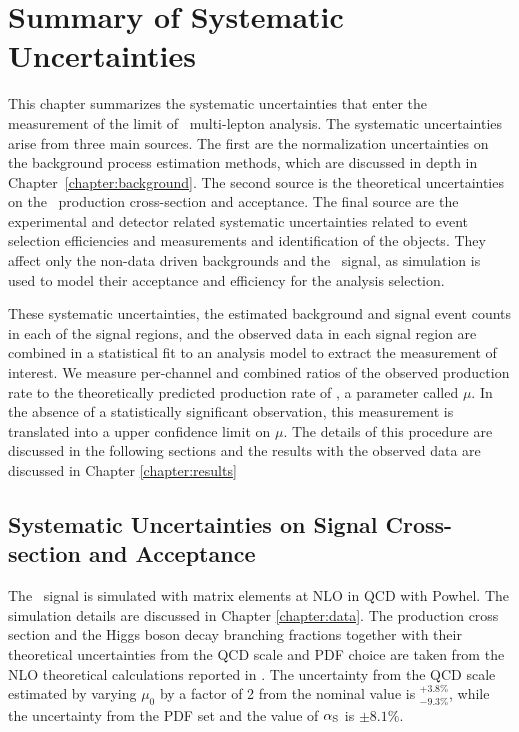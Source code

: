 \chapter[Summary of Systematic Uncertainties][Summary of Systematic Uncertainties]{Summary of Systematic Uncertainties}
\label{chapter:systematics} 

This chapter summarizes the systematic uncertainties that enter the measurement of the limit of \tth\ multi-lepton analysis. The systematic uncertainties arise from three main sources. The first are the normalization uncertainties on the background process estimation methods, which are discussed in depth in Chapter~\ref{chapter:background}. The second source is the theoretical uncertainties on the \tth\ production cross-section and acceptance. The final source are the experimental and detector related systematic uncertainties related to event selection efficiencies and measurements and identification of the objects. They affect only the non-data driven backgrounds and the \tth\ signal, as simulation is used to model their acceptance and efficiency for the analysis selection. 

These systematic uncertainties, the estimated background and signal event counts in each of the signal regions, and the observed data in each signal region are combined in a statistical fit to an analysis model to extract the measurement of interest. We measure per-channel and combined ratios of the observed production rate to the theoretically predicted production rate of \tth, a parameter called $\mu$. In the absence of a statistically significant observation, this measurement is translated into a upper confidence limit
on $\mu$. The details of this procedure are discussed in the following sections and the results with the observed data are discussed in Chapter \ref{chapter:results}

\section{Systematic Uncertainties on Signal Cross-section and Acceptance}
\label{section:tth}
The \tth\ signal is simulated with matrix elements at NLO in QCD with {\textsc Powhel}. The simulation details are discussed in Chapter \ref{chapter:data}. The production cross section and the Higgs boson decay branching fractions together with their theoretical uncertainties from the QCD scale and PDF choice are taken from the NLO theoretical calculations reported in \cite{Heinemeyer:2013tqa}. The uncertainty from the QCD scale estimated by varying $\mu_{0}$ by a factor of 2 from the nominal value is $^{+3.8\%}_{-9.3\%}$, while the uncertainty from the PDF set and the value of $\alpha_{\rm S}$ is $\pm 8.1\%$.

